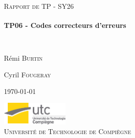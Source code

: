 \begin{titlepage}
\begin{center}



\textsc{\Large Rapport de TP - SY26}\\[0.5cm]
\vspace{4cm}
\HRule \\[0.4cm]
{ \huge \bfseries TP06 - Codes correcteurs d’erreurs \\[0.4cm] }

\HRule \\[1.5cm]

\begin{minipage}{0.4\textwidth}
\begin{flushleft} \large
R\'emi \textsc{Burtin}
\end{flushleft}
\end{minipage}
\begin{minipage}{0.4\textwidth}
\begin{flushright} \large
Cyril \textsc{Fougeray}
\end{flushright}
\end{minipage}

\vspace{4cm}

{\large \today}



\vfill
\includegraphics[width=0.25\textwidth]{logo.jpg}\\[0.5cm]

\textsc{\LARGE Universit\'{e} de Technologie de Compi\`{e}gne}\\[1.5cm]


\end{center}
\end{titlepage}
